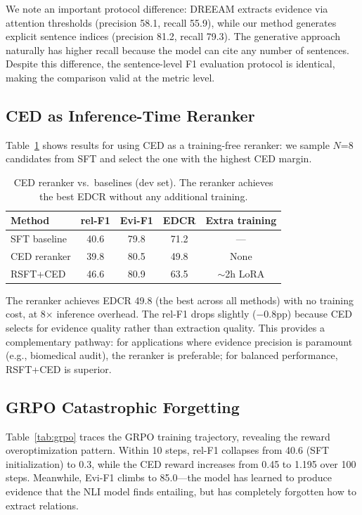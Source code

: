 \documentclass[11pt,a4paper]{article}
\begin{document}
We note an important protocol difference: DREEAM extracts evidence via attention thresholds (precision 58.1, recall 55.9), while our method generates explicit sentence indices (precision 81.2, recall 79.3). The generative approach naturally has higher recall because the model can cite any number of sentences. Despite this difference, the sentence-level F1 evaluation protocol is identical, making the comparison valid at the metric level.

\subsection{CED as Inference-Time Reranker}

Table~\ref{tab:reranker} shows results for using CED as a training-free reranker: we sample $N$=8 candidates from SFT and select the one with the highest CED margin.

\begin{table}[t]
\centering
\caption{CED reranker vs.\ baselines (dev set). The reranker achieves the best EDCR without any additional training.}
\label{tab:reranker}
\begin{tabular}{lcccc}
\toprule
\textbf{Method} & \textbf{rel-F1} & \textbf{Evi-F1} & \textbf{EDCR} & \textbf{Extra training} \\
\midrule
SFT baseline & 40.6 & 79.8 & 71.2 & --- \\
CED reranker & 39.8 & 80.5 & 49.8 & None \\
RSFT+CED & 46.6 & 80.9 & 63.5 & $\sim$2h LoRA \\
\bottomrule
\end{tabular}
\end{table}

The reranker achieves EDCR 49.8 (the best across all methods) with no training cost, at 8$\times$ inference overhead. The rel-F1 drops slightly ($-$0.8pp) because CED selects for evidence quality rather than extraction quality. This provides a complementary pathway: for applications where evidence precision is paramount (e.g., biomedical audit), the reranker is preferable; for balanced performance, RSFT+CED is superior.

\subsection{GRPO Catastrophic Forgetting}

Table~\ref{tab:grpo} traces the GRPO training trajectory, revealing the reward overoptimization pattern. Within 10 steps, rel-F1 collapses from 40.6 (SFT initialization) to 0.3, while the CED reward increases from 0.45 to 1.195 over 100 steps. Meanwhile, Evi-F1 climbs to 85.0---the model has learned to produce evidence that the NLI model finds entailing, but has completely forgotten how to extract relations.
\end{document}
